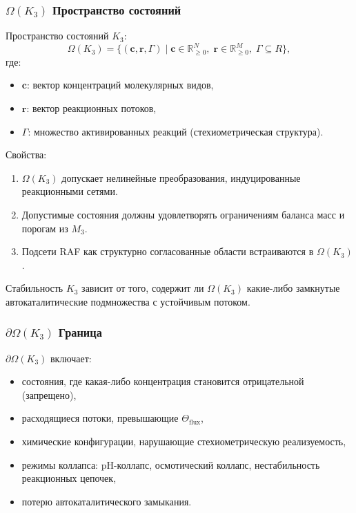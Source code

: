 \subsubsection{\texorpdfstring{$\Omega(K_3)$}{\Omega(K_3)} Пространство состояний}

Пространство состояний $K_3$:
\[
\Omega(K_3) = \{ (\mathbf{c}, \mathbf{r}, \Gamma) \mid
\mathbf{c} \in \mathbb{R}_{\ge0}^N,\;
\mathbf{r} \in \mathbb{R}_{\ge0}^M,\;
\Gamma \subseteq R \},
\]
где:
\begin{itemize}
    \item $\mathbf{c}$: вектор концентраций молекулярных видов,
    \item $\mathbf{r}$: вектор реакционных потоков,
    \item $\Gamma$: множество активированных реакций (стехиометрическая структура).
\end{itemize}

Свойства:
\begin{enumerate}
    \item $\Omega(K_3)$ допускает нелинейные преобразования, индуцированные
          реакционными сетями.
    \item Допустимые состояния должны удовлетворять ограничениям баланса масс и
          порогам из $M_3$.
    \item Подсети RAF как структурно согласованные области встраиваются в
          $\Omega(K_3)$.
\end{enumerate}

Стабильность $K_3$ зависит от того, содержит ли $\Omega(K_3)$ какие-либо
замкнутые автокаталитические подмножества с устойчивым потоком.

\subsubsection{\texorpdfstring{$\partial\Omega(K_3)$}{\partial\Omega(K_3)} Граница}

$\partial\Omega(K_3)$ включает:
\begin{itemize}
    \item состояния, где какая-либо концентрация становится отрицательной
          (запрещено),
    \item расходящиеся потоки, превышающие $\Theta_{\mathrm{flux}}$,
    \item химические конфигурации, нарушающие стехиометрическую реализуемость,
    \item режимы коллапса: pH-коллапс, осмотический коллапс,
          нестабильность реакционных цепочек,
    \item потерю автокаталитического замыкания.
\end{itemize}

